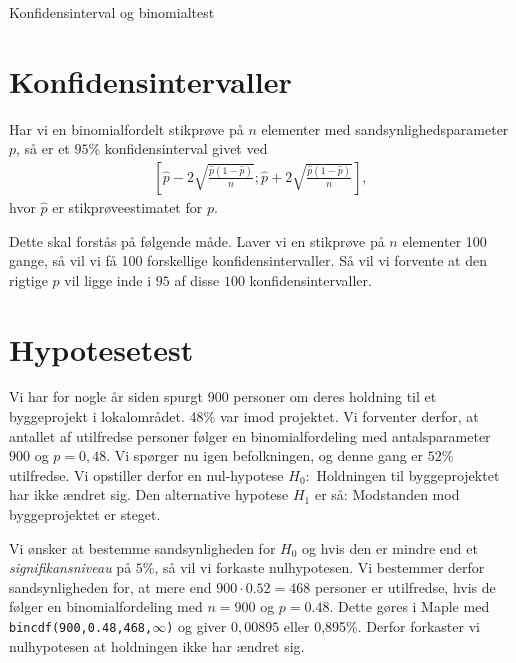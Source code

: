 \begin{center}
\Huge
Konfidensinterval og binomialtest
\end{center}
\section*{Konfidensintervaller}
\begin{setn}
Har vi en binomialfordelt stikprøve på $n$ elementer med sandsynlighedsparameter $p$, så er et $95\%$ konfidensinterval givet ved
\begin{align*}
\left[ \hat{p} - 2\sqrt{\frac{\hat{p}(1-\hat{p})}{n}};\hat{p} + 2\sqrt{\frac{\hat{p}(1-\hat{p})}{n}}\right],
\end{align*}
hvor $\hat{p}$ er stikprøveestimatet for $p$. 
\end{setn}
Dette skal forstås på følgende måde. Laver vi en stikprøve på $n$ elementer 100 gange, så vil vi få 100 forskellige konfidensintervaller. Så vil vi forvente at den rigtige $p$ vil ligge inde i $95$ af disse $100$ konfidensintervaller.

\section*{Hypotesetest}
Vi har for nogle år siden spurgt 900 personer om deres holdning til et byggeprojekt i lokalområdet. 48$\%$ var imod projektet. Vi forventer derfor, at antallet af utilfredse personer følger en binomialfordeling med antalsparameter $900$ og $p = 0,48$. Vi spørger nu igen befolkningen, og denne gang er $52\%$ utilfredse. Vi opstiller derfor en nul-hypotese $H_0:$ Holdningen til byggeprojektet har ikke ændret sig. Den alternative hypotese $H_1$ er så: Modstanden mod byggeprojektet er steget. 

Vi ønsker at bestemme sandsynligheden for $H_0$ og hvis den er mindre end et \textit{signifikansniveau} på $5\%$, så vil vi forkaste nulhypotesen. 
Vi bestemmer derfor sandsynligheden for, at mere end $900\cdot 0.52 = 468$ personer er utilfredse, hvis de følger en binomialfordeling med $n=900$ og $p = 0.48$. Dette gøres i Maple med \texttt{bincdf(900,0.48,468,$\infty$)} og giver 
$0,00895$ eller 0,895$\%$. Derfor forkaster vi nulhypotesen at holdningen ikke har ændret sig. 

